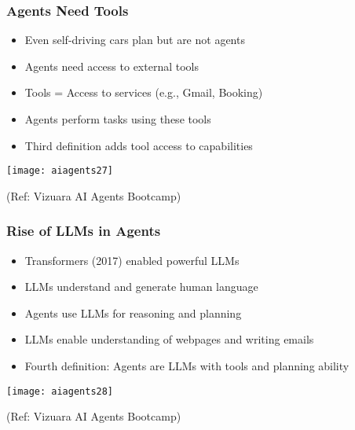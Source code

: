 \begin{frame}[fragile]\frametitle{Agents Need Tools}

      \begin{itemize}
        \item Even self-driving cars plan but are not agents
        \item Agents need access to external tools
        \item Tools = Access to services (e.g., Gmail, Booking)
        \item Agents perform tasks using these tools
        \item Third definition adds tool access to capabilities
      \end{itemize}

		\begin{center}
		\texttt{[image: aiagents27]}
		
		{\tiny (Ref: Vizuara AI Agents Bootcamp)}
		\end{center}	

\end{frame}

\begin{frame}[fragile]\frametitle{Rise of LLMs in Agents}

      \begin{itemize}
        \item Transformers (2017) enabled powerful LLMs
        \item LLMs understand and generate human language
        \item Agents use LLMs for reasoning and planning
        \item LLMs enable understanding of webpages and writing emails
        \item Fourth definition: Agents are LLMs with tools and planning ability
      \end{itemize}

		\begin{center}
		\texttt{[image: aiagents28]}
		
		{\tiny (Ref: Vizuara AI Agents Bootcamp)}
		\end{center}	

\end{frame}

